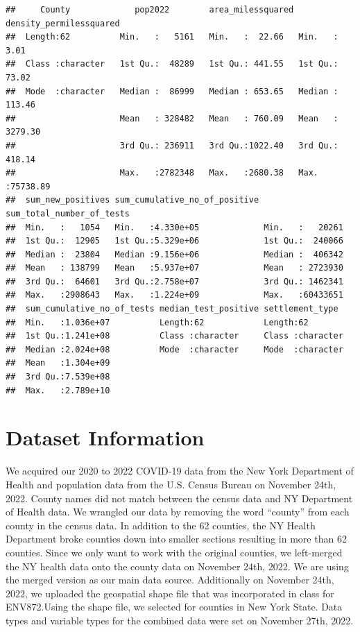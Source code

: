 \documentclass[
  12pt,
]{article}
\begin{document}
\begin{verbatim}
##     County             pop2022        area_milessquared density_permilessquared
##  Length:62          Min.   :   5161   Min.   :  22.66   Min.   :    3.01       
##  Class :character   1st Qu.:  48289   1st Qu.: 441.55   1st Qu.:   73.02       
##  Mode  :character   Median :  86999   Median : 653.65   Median :  113.46       
##                     Mean   : 328482   Mean   : 760.09   Mean   : 3279.30       
##                     3rd Qu.: 236911   3rd Qu.:1022.40   3rd Qu.:  418.14       
##                     Max.   :2782348   Max.   :2680.38   Max.   :75738.89       
##  sum_new_positives sum_cumulative_no_of_positive sum_total_number_of_tests
##  Min.   :   1054   Min.   :4.330e+05             Min.   :   20261         
##  1st Qu.:  12905   1st Qu.:5.329e+06             1st Qu.:  240066         
##  Median :  23804   Median :9.156e+06             Median :  406342         
##  Mean   : 138799   Mean   :5.937e+07             Mean   : 2723930         
##  3rd Qu.:  64601   3rd Qu.:2.758e+07             3rd Qu.: 1462341         
##  Max.   :2908643   Max.   :1.224e+09             Max.   :60433651         
##  sum_cumulative_no_of_tests median_test_positive settlement_type   
##  Min.   :1.036e+07          Length:62            Length:62         
##  1st Qu.:1.241e+08          Class :character     Class :character  
##  Median :2.024e+08          Mode  :character     Mode  :character  
##  Mean   :1.304e+09                                                 
##  3rd Qu.:7.539e+08                                                 
##  Max.   :2.789e+10
\end{verbatim}

\newpage

\hypertarget{dataset-information}{%
\section{Dataset Information}\label{dataset-information}}

We acquired our 2020 to 2022 COVID-19 data from the New York Department
of Health and population data from the U.S. Census Bureau on November
24th, 2022. County names did not match between the census data and NY
Department of Health data. We wrangled our data by removing the word
``county'' from each county in the census data. In addition to the 62
counties, the NY Health Department broke counties down into smaller
sections resulting in more than 62 counties. Since we only want to work
with the original counties, we left-merged the NY health data onto the
county data on November 24th, 2022. We are using the merged version as
our main data source. Additionally on November 24th, 2022, we uploaded
the geospatial shape file that was incorporated in class for
ENV872.Using the shape file, we selected for counties in New York State.
Data types and variable types for the combined data were set on November
27th, 2022.
\end{document}
